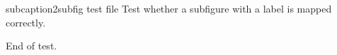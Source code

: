 subcaption2subfig test file
Test whether a subfigure with a label is mapped correctly.



End of test.
